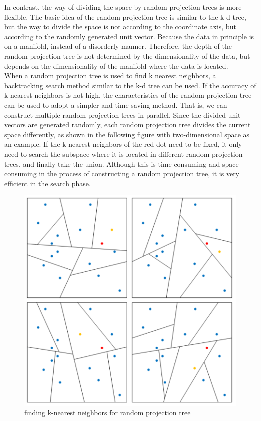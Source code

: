 \noindent In contrast, the way of dividing the space by random projection trees is more flexible. The basic idea of the random projection tree is similar to the k-d tree, but the way to divide the space is not according to the coordinate axis, but according to the randomly generated unit vector. Because the data in principle is on a manifold, instead of a disorderly manner. Therefore, the depth of the random projection tree is not determined by the dimensionality of the data, but depends on the dimensionality of the manifold where the data is located\cite{ref6}.\\

\noindent When a random projection tree is used to find k nearest neighbors, a backtracking search method similar to the k-d tree can be used. If the accuracy of k-nearest neighbors is not high, the characteristics of the random projection tree can be used to adopt a simpler and time-saving method. That is, we can construct multiple random projection trees in parallel. Since the divided unit vectors are generated randomly, each random projection tree divides the current space differently, as shown in the following figure with two-dimensional space as an example. If the k-nearest neighbors of the red dot need to be fixed, it only need to search the subspace where it is located in different random projection trees, and finally take the union. Although this is time-consuming and space-consuming in the process of constructing a random projection tree, it is very efficient in the search phase.

\begin{figure}[ht]

\centering
\includegraphics[scale=0.85]{images/image_largevis_random_projection_tree_2.PNG}
\caption{finding k-nearest neighbors for random projection tree}
\label{fig:label}
\end{figure}

